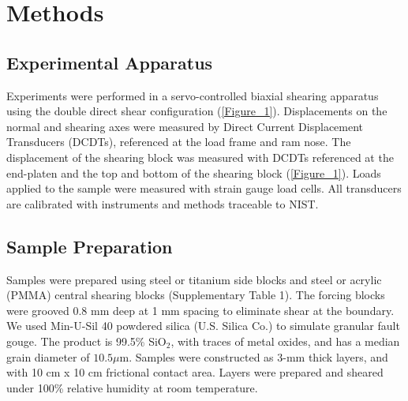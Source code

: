 \section{Methods}
\subsection{Experimental Apparatus}
Experiments were performed in a servo-controlled biaxial shearing apparatus using the double direct shear configuration (\ref{Figure_1}). Displacements on the normal and shearing axes were measured by Direct Current Displacement Transducers (DCDTs), referenced at the load frame and ram nose. The displacement of the shearing block was measured with DCDTs referenced at the end-platen and the top and bottom of the shearing block (\ref{Figure_1}). Loads applied to the sample were measured with strain gauge load cells. All transducers are calibrated with instruments and methods traceable to NIST. 

\subsection{Sample Preparation}
Samples were prepared using steel or titanium side blocks and steel or acrylic (PMMA) central shearing blocks (Supplementary Table 1). The forcing blocks were grooved 0.8 mm deep at 1 mm spacing to eliminate shear at the boundary. We used Min-U-Sil 40 powdered silica (U.S. Silica Co.) to simulate granular fault gouge. The product is 99.5\% SiO$_2$, with traces of metal oxides, and has a median grain diameter of $10.5 \mu\text{m}$. Samples were constructed as 3-mm thick layers, and with 10 cm x 10 cm frictional contact area. Layers were prepared and sheared under 100\% relative humidity at room temperature. 

